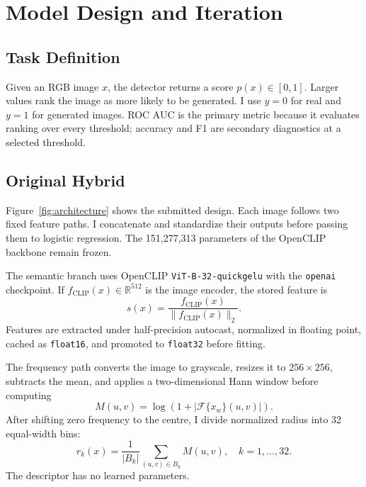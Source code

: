 \documentclass[10pt,twocolumn]{article}
\newcommand{\code}[1]{\texttt{#1}}
\begin{document}
\section{Model Design and Iteration}

\subsection{Task Definition}

Given an RGB image $x$, the detector returns a score $p(x)\in[0,1]$. Larger values rank the image as
more likely to be generated. I use $y=0$ for real and $y=1$ for generated images. ROC AUC is the
primary metric because it evaluates ranking over every threshold; accuracy and F1 are secondary
diagnostics at a selected threshold.

\subsection{Original Hybrid}

Figure~\ref{fig:architecture} shows the submitted design. Each image follows two fixed feature paths.
I concatenate and standardize their outputs before passing them to logistic regression. The
151,277,313 parameters of the OpenCLIP backbone remain frozen.

The semantic branch uses OpenCLIP \code{ViT-B-32-quickgelu} with the \code{openai} checkpoint. If
$f_{\mathrm{CLIP}}(x)\in\mathbb{R}^{512}$ is the image encoder, the stored feature is
\begin{equation}
  s(x)=\frac{f_{\mathrm{CLIP}}(x)}{\lVert f_{\mathrm{CLIP}}(x)\rVert_2}.
\end{equation}
Features are extracted under half-precision autocast, normalized in floating point, cached as
\code{float16}, and promoted to \code{float32} before fitting.

The frequency path converts the image to grayscale, resizes it to $256\times256$, subtracts the mean,
and applies a two-dimensional Hann window before computing
\begin{equation}
  M(u,v)=\log\!\left(1+\left|\mathcal{F}\{x_w\}(u,v)\right|\right).
\end{equation}
After shifting zero frequency to the centre, I divide normalized radius into 32 equal-width bins:
\begin{equation}
 r_k(x)=\frac{1}{|B_k|}\sum_{(u,v)\in B_k}M(u,v),\quad k=1,\ldots,32.
\end{equation}
The descriptor has no learned parameters.
\end{document}
